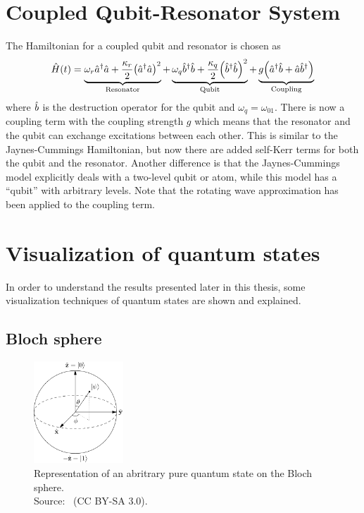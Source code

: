 \documentclass[main.tex]{subfiles}
\begin{document}
\section{Coupled Qubit-Resonator System}
The Hamiltonian for a coupled qubit and resonator is chosen as
\begin{equation}
    \hat{H}(t) = \underbrace{\omega_r\hat{a}^\dagger\hat{a} + \frac{\kappa_r}{2}\qty(\hat{a}^\dagger\hat{a})^2}_{\text{Resonator}} + \underbrace{\omega_{q}\hat{b}^\dagger\hat{b} + \frac{\kappa_q}{2}\qty(\hat{b}^\dagger\hat{b})^2}_{\text{Qubit}} + \underbrace{g\qty(\hat{a}^\dagger\hat{b}+\hat{a}\hat{b}^\dagger)}_{\text{Coupling}}
\end{equation}
where \( \hat{b} \) is the destruction operator for the qubit and \( \omega_q = \omega_{01} \).
There is now a coupling term with the coupling strength \(g\) which means that the resonator and the qubit can exchange excitations between each other.
This is similar to the Jaynes-Cummings Hamiltonian, but now there are added self-Kerr terms for both the qubit and the resonator.
Another difference is that the Jaynes-Cummings model explicitly deals with a two-level qubit or atom, while this model has a ``qubit'' with arbitrary levels.
Note that the rotating wave approximation has been applied to the coupling term.

\section{Visualization of quantum states}
In order to understand the results presented later in this thesis, some visualization techniques of quantum states are shown and explained.

\subsection{Bloch sphere}
\begin{figure}[t]
    \centering
    \includegraphics[width=0.3\textwidth]{figs/bloch_sphere.png}
    \caption{Representation of an abritrary pure quantum state on the Bloch sphere.
    \\ Source:~\cite{noauthor_file:bloch_nodate} (CC BY-SA 3.0).
    }%
    \label{fig:bloch_sphere}
\end{figure}
\end{document}
